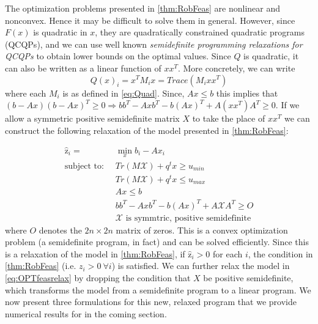 \documentclass[11pt]{article}
\theoremstyle{plain}
\theoremstyle{definition}
\theoremstyle{remark}
\begin{document}


The optimization problems presented in \cref{thm:RobFeas} are nonlinear and nonconvex.
Hence it may be difficult to solve them in general.
However, since $F(x)$ is quadratic in $x$, they are quadratically constrained quadratic programs (QCQPs), and we can use well known \emph{semidefinite programming relaxations for QCQPs} %
to obtain lower bounds on the optimal values.
Since $Q$ is quadratic, it can also be written as a linear function of $xx^T$.
More concretely, we can write
$$Q(x)_i=x^TM_ix=Trace(M_ixx^T)$$
where each $M_i$ is as defined in \eqref{eq:Quad}. 
Since, $Ax\leq b$ this implies that $(b-Ax)(b-Ax)^T\geq 0\Rightarrow bb^T-Axb^T-b(Ax)^T+A(xx^T)A^T\geq 0$. 
If we allow a symmetric positive semidefinite matrix $X$ to take the place of $xx^T$ we can construct the following relaxation of the model presented in \cref{thm:RobFeas}:
 
\begin{subequations}\label{eq:OPTfeasrelax}
\begin{align}
\hat{\mathrm{z}}_{i} = &\min_x b_i-Ax_i  \\
 \text{subject to: } \ &Tr\left(M\mathcal{X}\right)+q^tx \geq u_{min} \\
 & Tr\left(M\mathcal{X}\right)+q^tx \leq u_{max} \\
 	&Ax\leq b \\
 	&bb^T-Axb^T-b(Ax)^T+A\mathcal{X}A^T\geq O \\
 	&\mathcal{X} \text{ is symmtric, positive semidefinite}
\end{align}
\end{subequations}
where $O$ denotes the $2n \times 2n$ matrix of zeros. This is a convex optimization problem (a semidefinite program, in fact) and can be solved efficiently. Since this is a relaxation of the model in \cref{thm:RobFeas}, if $\hat{\mathrm{z}}_i>0$ for each $i$, the condition in \cref{thm:RobFeas} (i.e. $z_i>0 \ \forall i$) is satisfied. We can further relax the model in \eqref{eq:OPTfeasrelax} by dropping the condition that $X$ be positive semidefinite, which transforms the model from a semidefinite program to a linear program. We now present three formulations for this new, relaxed program that we provide numerical results for in the coming section.
\end{document}
